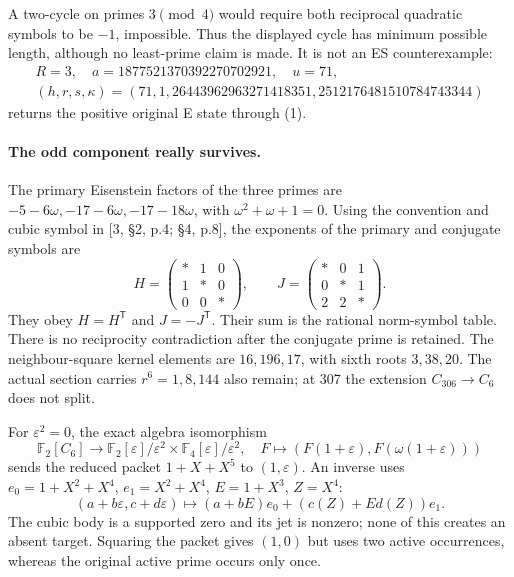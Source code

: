\documentclass[11pt,reqno]{amsart}
\begin{document}
A two-cycle on primes $3\pmod4$ would require both reciprocal quadratic symbols
to be $-1$, impossible. Thus the displayed cycle has minimum possible length,
although no least-prime claim is made. It is not an ES counterexample:
\[
 \begin{gathered}
 R=3,\quad a=1877521370392270702921,\quad u=71,\\
 (h,r,s,\kappa)=(71,1,26443962963271418351,2512176481510784743344)
 \end{gathered}
\]
returns the positive original E state through (1).

\paragraph{The odd component really survives.}
The primary Eisenstein factors of the three primes are
$-5-6\omega,-17-6\omega,-17-18\omega$, with $\omega^2+\omega+1=0$.
Using the convention and cubic symbol in [3, \S2, p.4; \S4, p.8], the exponents
of the primary and conjugate symbols are
\[
 H=\begin{pmatrix}*&1&0\\1&*&0\\0&0&*\end{pmatrix},\qquad
 J=\begin{pmatrix}*&0&1\\0&*&1\\2&2&*\end{pmatrix}.
\]
They obey $H=H^{\mathsf T}$ and $J=-J^{\mathsf T}$. Their sum is the rational
norm-symbol table. There is no reciprocity contradiction after the conjugate
prime is retained. The neighbour-square kernel elements are $16,196,17$, with
sixth roots $3,38,20$. The actual section carries $r^6=1,8,144$ also remain;
at 307 the extension $C_{306}\to C_6$ does not split.

For $\varepsilon^2=0$, the exact algebra isomorphism
\[
 \mathbb F_2[C_6]\longrightarrow
 \mathbb F_2[\varepsilon]/\varepsilon^2\times
 \mathbb F_4[\varepsilon]/\varepsilon^2,
 \quad F\longmapsto(F(1+\varepsilon),F(\omega(1+\varepsilon)))
\]
sends the reduced packet $1+X+X^5$ to $(1,\varepsilon)$.
An inverse uses $e_0=1+X^2+X^4$, $e_1=X^2+X^4$, $E=1+X^3$, $Z=X^4$:
\[
 (a+b\varepsilon,c+d\varepsilon)
 \longmapsto(a+bE)e_0+(c(Z)+Ed(Z))e_1.
\]
The cubic body is a supported zero and its jet is nonzero; none of this creates
an absent target. Squaring the packet gives $(1,0)$ but uses two active
occurrences, whereas the original active prime occurs only once.
\end{document}
